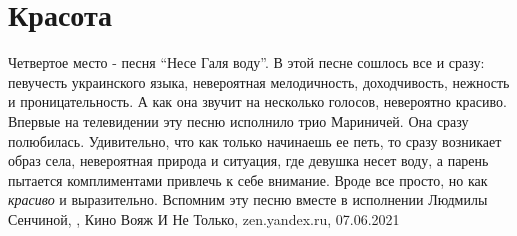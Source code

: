  
 
 
 
 
\chapter{Красота}

Четвертое место - песня \enquote{Несе Галя воду}. В этой песне сошлось все и
сразу: певучесть украинского языка, невероятная мелодичность, доходчивость,
нежность и проницательность. А как она звучит на несколько голосов, невероятно
красиво. Впервые на телевидении эту песню исполнило трио Мариничей. Она сразу
полюбилась. Удивительно, что как только начинаешь ее петь, то сразу возникает
образ села, невероятная природа и ситуация, где девушка несет воду, а парень
пытается комплиментами привлечь к себе внимание. Вроде все просто, но как
\emph{красиво} и выразительно. Вспомним эту песню вместе в исполнении Людмилы
Сенчиной,
, 
Кино Вояж И Не Только, zen.yandex.ru, 07.06.2021


